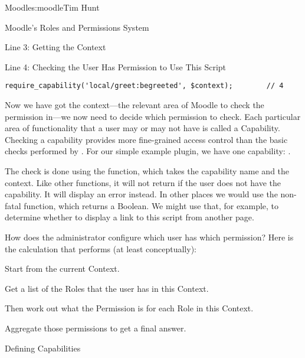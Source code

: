 \begin{aosachapter}{Moodle}{s:moodle}{Tim Hunt}
\begin{aosasect1}{Moodle's Roles and Permissions System}
\begin{aosasect2}{Line 3: Getting the Context}
\end{aosasect2}

\begin{aosasect2}{Line 4: Checking the User Has Permission to Use This Script}

\begin{verbatim}
require_capability('local/greet:begreeted', $context);        // 4
\end{verbatim}

Now we have got the context---the relevant area of Moodle to check the
permission in---we now need to decide which permission to check. Each
particular area of functionality that a user may or may not have is
called a Capability. Checking a capability provides more fine-grained
access control than the basic checks performed by
. For our simple example plugin, we have one
capability: .

The check is done using the  function, which
takes the capability name and the context. Like other
 functions, it will not return if the user
does not have the capability. It will display an error instead. In
other places we would use the non-fatal 
function, which returns a Boolean. We might use that, for example, to
determine whether to display a link to this script from another page.

How does the administrator configure which user has which permission?
Here is the calculation that  performs (at least
conceptually):

\begin{aosaenumerate}

\item Start from the current Context.

\item Get a list of the Roles that the user has in this Context.

\item Then work out what the Permission is for each Role in this
  Context.

\item Aggregate those permissions to get a final answer.

\end{aosaenumerate}

\end{aosasect2}

\begin{aosasect2}{Defining Capabilities}


\end{aosasect2}
\end{aosasect1}
\end{aosachapter}
